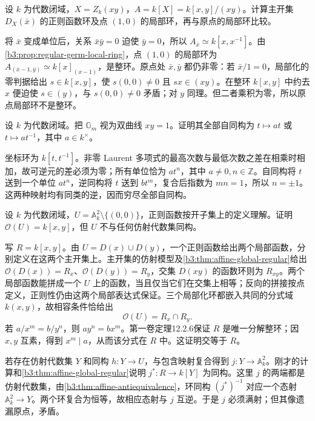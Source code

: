 \begin{exercise}\label{b3:ex:07-crossed-lines-localization}
	设 \(k\) 为代数闭域，\(X=Z_k(xy)\)，\(A=k[X]=k[x,y]/(xy)\)。计算主开集 \(D_X(\bar x)\) 的正则函数环及点 \((1,0)\) 的局部环，再与原点的局部环比较。
\end{exercise}
\begin{solution}
	将 \(\bar x\) 变成单位后，关系 \(\bar x\bar y=0\) 迫使 \(\bar y=0\)，所以 \(A_{\bar x}\simeq k[x,x^{-1}]\)。由\cref{b3:prop:regular-germ-local-ring}，点 \((1,0)\) 的局部环为 \(A_{(\bar x-1,\bar y)}\simeq k[x]_{(x-1)}\)，是整环。原点处 \(\bar x,\bar y\) 都仍非零：若 \(\bar x/1=0\)，局部化的零判据给出 \(s\in k[x,y]\)，使 \(s(0,0)\ne0\) 且 \(sx\in(xy)\)。在整环 \(k[x,y]\) 中约去 \(x\) 便迫使 \(s\in(y)\)，与 \(s(0,0)\ne0\) 矛盾；对 \(y\) 同理。但二者乘积为零，所以原点局部环不是整环。
\end{solution}

\begin{exercise}\label{b3:ex:07-multiplicative-line-automorphisms}
	设 \(k\) 为代数闭域。把 \(\mathbb G_m\) 视为双曲线 \(xy=1\)。证明其全部自同构为 \(t\mapsto at\) 或 \(t\mapsto at^{-1}\)，其中 \(a\in k^\times\)。
\end{exercise}
\begin{solution}
	坐标环为 \(k[t,t^{-1}]\)。非零 Laurent 多项式的最高次数与最低次数之差在相乘时相加，故可逆元的差必须为零；所有单位恰为 \(at^n\)，其中 \(a\ne0,n\in\mathbb Z\)。自同构将 \(t\) 送到一个单位 \(at^n\)，逆同构将 \(t\) 送到 \(bt^m\)，复合后指数为 \(mn=1\)，所以 \(n=\pm1\)。这两种映射均有同类的逆，因而穷尽全部自同构。
\end{solution}

\begin{exercise}\label{b3:ex:07-punctured-plane}
	设 \(k\) 为代数闭域，\(U=\mathbb A_k^2\setminus\bigl\{(0,0)\bigr\}\)，正则函数按开子集上的定义理解。证明 \(\mathcal O(U)=k[x,y]\)，但 \(U\) 不与任何仿射代数集同构。
\end{exercise}
\begin{solution}
	写 \(R=k[x,y]\)。由 \(U=D(x)\cup D(y)\)，一个正则函数给出两个局部函数，分别定义在这两个主开集上。主开集的仿射模型及\cref{b3:thm:affine-global-regular}给出 \(\mathcal O(D(x))=R_x\)、\(\mathcal O(D(y))=R_y\)，交集 \(D(xy)\) 的函数环则为 \(R_{xy}\)。两个局部函数能拼成一个 \(U\) 上的函数，当且仅当它们在交集上相等；反向的拼接按点定义，正则性仍由这两个局部表达式保证。三个局部化环都嵌入共同的分式域 \(k(x,y)\)，故相容条件恰给出
	\[
		\mathcal O(U)=R_x\cap R_y.
	\]
	若 \(a/x^m=b/y^n\)，则 \(ay^n=bx^m\)。第一卷定理12.2.6保证 \(R\) 是唯一分解整环；因 \(x,y\) 互素，得到 \(x^m\mid a\)，从而该分式在 \(R\) 中。这证明交等于 \(R\)。

	若存在仿射代数集 \(Y\) 和同构 \(h:Y\to U\)，与包含映射复合得到 \(j:Y\to\mathbb A_k^2\)。刚才的计算和\cref{b3:thm:affine-global-regular}说明 \(j^*:R\to k[Y]\) 为同构。这里 \(j\) 的两端都是仿射代数集，由\cref{b3:thm:affine-antiequivalence}，环同构 \((j^*)^{-1}\) 对应一个态射 \(\mathbb A_k^2\to Y\)。两个环复合为恒等，故相应态射与 \(j\) 互逆。于是 \(j\) 必须满射；但其像遗漏原点，矛盾。
\end{solution}

